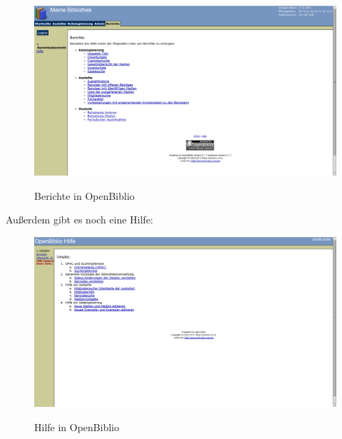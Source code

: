 \documentclass[fontsize=12pt,paper=a4,twoside]{scrartcl}
\begin{document}
\begin{figure}
	[H] \caption{Berichte in OpenBiblio} 
	\includegraphics[width=1 
	\textwidth]{OpenBiblio/reiter_berichte.png} \label{berichte-openbiblio} 
\end{figure}
Außerdem gibt es noch eine Hilfe: 
\begin{figure}
	[H] \caption{Hilfe in OpenBiblio} 
	\includegraphics[width=14.2cm]{OpenBiblio/hilfe.png} \label{hilfe-openbiblio} 
\end{figure}
\end{document}
